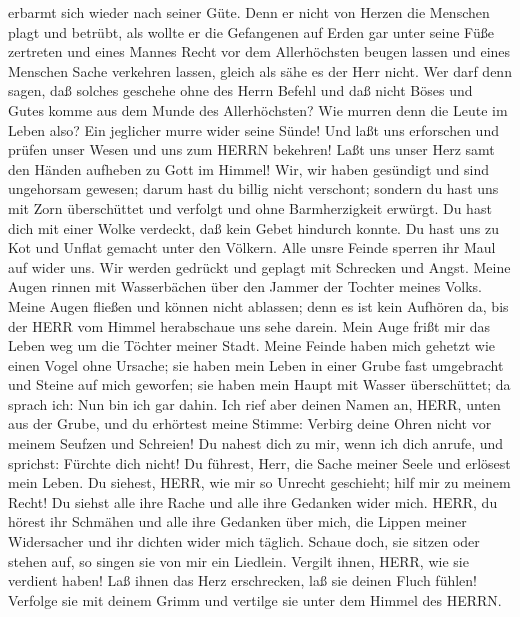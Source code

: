 erbarmt sich wieder nach seiner Güte.  Denn er nicht von
Herzen die Menschen plagt und betrübt,  als wollte er die
Gefangenen auf Erden gar unter seine Füße zertreten  und
eines Mannes Recht vor dem Allerhöchsten beugen lassen  und
eines Menschen Sache verkehren lassen, gleich als sähe es der Herr
nicht.  Wer darf denn sagen, daß solches geschehe ohne des
Herrn Befehl  und daß nicht Böses und Gutes komme aus dem
Munde des Allerhöchsten?  Wie murren denn die Leute im
Leben also? Ein jeglicher murre wider seine Sünde!  Und
laßt uns erforschen und prüfen unser Wesen und uns zum HERRN bekehren!
 Laßt uns unser Herz samt den Händen aufheben zu Gott im
Himmel!  Wir, wir haben gesündigt und sind ungehorsam
gewesen; darum hast du billig nicht verschont;  sondern du
hast uns mit Zorn überschüttet und verfolgt und ohne Barmherzigkeit
erwürgt.  Du hast dich mit einer Wolke verdeckt, daß kein
Gebet hindurch konnte.  Du hast uns zu Kot und Unflat
gemacht unter den Völkern.  Alle unsre Feinde sperren ihr
Maul auf wider uns.  Wir werden gedrückt und geplagt mit
Schrecken und Angst.  Meine Augen rinnen mit Wasserbächen
über den Jammer der Tochter meines Volks.  Meine Augen
fließen und können nicht ablassen; denn es ist kein Aufhören da,
 bis der HERR vom Himmel herabschaue uns sehe darein.
 Mein Auge frißt mir das Leben weg um die Töchter meiner
Stadt.  Meine Feinde haben mich gehetzt wie einen Vogel
ohne Ursache;  sie haben mein Leben in einer Grube fast
umgebracht und Steine auf mich geworfen;  sie haben mein
Haupt mit Wasser überschüttet; da sprach ich: Nun bin ich gar dahin.
 Ich rief aber deinen Namen an, HERR, unten aus der Grube,
 und du erhörtest meine Stimme: Verbirg deine Ohren nicht
vor meinem Seufzen und Schreien!  Du nahest dich zu mir,
wenn ich dich anrufe, und sprichst: Fürchte dich nicht!  Du
führest, Herr, die Sache meiner Seele und erlösest mein Leben.
 Du siehest, HERR, wie mir so Unrecht geschieht; hilf mir
zu meinem Recht!  Du siehst alle ihre Rache und alle ihre
Gedanken wider mich.  HERR, du hörest ihr Schmähen und alle
ihre Gedanken über mich,  die Lippen meiner Widersacher und
ihr dichten wider mich täglich.  Schaue doch, sie sitzen
oder stehen auf, so singen sie von mir ein Liedlein. 
Vergilt ihnen, HERR, wie sie verdient haben!  Laß ihnen das
Herz erschrecken, laß sie deinen Fluch fühlen!  Verfolge
sie mit deinem Grimm und vertilge sie unter dem Himmel des HERRN.

